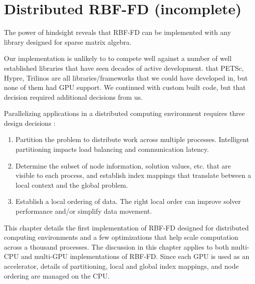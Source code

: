 \documentclass{report}
\begin{document}
\fi


\chapter{Distributed RBF-FD (incomplete)}
\label{chap:distributed_rbffd}



The power of hindsight reveals that RBF-FD can be implemented with any library designed for sparse matrix algebra. 

Our implementation is unlikely to to compete well against a number of well established libraries that have seen decades of active development. 
 that PETSc, Hypre, Trilinos are all libraries/frameworks that we could have developed in, but none of them had GPU support. We continued with custom built code, but that decision required additional decisions from us. 

\cite{Yokota2010}
\cite{Yokota2012}
\cite{Schubert2011} 


Parallelizing applications in a distributed computing environment requires three
design decisions \cite{Saad2003}: 
\begin{enumerate} 
\item Partition the problem to distribute work across multiple processes. Intelligent partitioning
impacts load balancing and communication latency.
\item Determine the subset of node information,
solution values, etc. that are visible to each process, and establish index mappings that translate between a local context and the global problem. 
\item Establish a local ordering of data. The right local order can improve solver performance and/or simplify data movement. %
\end{enumerate}

This chapter details the first implementation of RBF-FD designed for distributed computing environments and a few optimizations that help scale computation across a thousand processes. The discussion in this chapter applies to both multi-CPU and multi-GPU implementations of RBF-FD. Since each GPU is used as an accelerator, details of partitioning, local and global index mappings, and node ordering are managed on the CPU.  
\end{document}
